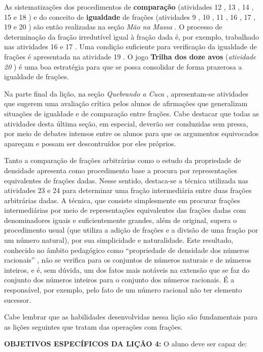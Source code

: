 \documentclass[oneside]{book}
\begin{document}
  As sistematizações dos procedimentos de   {\bf comparação}   (atividades 12  , 
13  , 14  , 15   e 18  ) e do conceito de   {\bf igualdade}   de frações 
(atividades 9  , 10  , 11  , 16  , 17  , 19   e 20  ) são então realizadas na 
seção   {\it Mão na Massa}  . O processo de determinação da fração irredutível 
igual à fração dada é, por exemplo, trabalhado nas atividades 16   e 17  . Uma 
condição suficiente para verificação da igualdade de frações é apresentada na 
atividade 19  . O jogo   {\bf Trilha dos doze avos}   (\emph{atividade 20}  ) é 
uma boa estratégia para que se possa consolidar de forma prazerosa a igualdade 
de frações.   
  
  Na parte final da lição, na seção   {\it Quebrando a Cuca}  , apresentam-se 
atividades que sugerem uma avaliação crítica pelos alunos de afirmações que 
generalizam situações de igualdade e de comparação entre frações. Cabe destacar 
que todas as atividades desta última seção, em especial, deverão ser conduzidas 
sem pressa, por meio de debates intensos entre os alunos para que os argumentos 
equivocados apareçam e possam ser descontruídos por eles próprios.  
  
  Tanto a comparação de frações arbitrárias como o estudo da propriedade de 
densidade apresenta como procedimento base a procura por representações 
equivalentes de frações dadas. Nesse sentido, destaca-se a técnica utilizada nas 
atividades 23   e 24   para determinar uma fração intermediária entre duas 
frações arbitrárias dadas. A técnica, que consiste simplesmente em procurar 
frações intermediárias por meio de representações equivalentes das frações dadas 
com denominadores iguais e suficientemente grandes, além de original, supera o 
procedimento usual (que utiliza a adição de frações e a divisão de uma fração 
por um número natural), por sua simplicidade e naturalidade. Este resultado, 
conhecido no âmbito pedagógico como   ``propriedade de densidade dos números 
racionais''  , não se verifica para os conjuntos de números naturais e de 
números inteiros, e é, sem dúvida, um dos fatos mais notáveis na extensão que se 
faz do conjunto dos números inteiros para o conjunto dos números racionais.  É a 
responsável, por exemplo, pelo fato de um número racional não ter elemento 
sucessor.   
  
  Cabe lembrar que as habilidades desenvolvidas nessa lição são fundamentais 
para as lições seguintes que tratam das operações com frações.  
  
  {\bf OBJETIVOS ESPECÍFICOS DA LIÇÃO 4:}   O aluno deve ser capaz de:  
  
\end{document}
